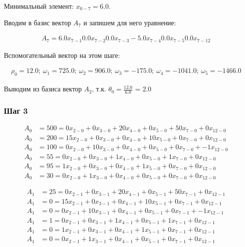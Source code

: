 Минимальный элемент: $x_{0-7} = 6.0$.

Вводим в базис вектор $A_{7}$ и запишем для него уравнение:

\small

\vspace{-\baselineskip}\begin{align*}
A_{7} = 6.0x_{7-1}0.0x_{7-2}0.0x_{7-3}-5.0x_{7-4}0.0x_{7-5}0.0x_{7-12}
\end{align*}

\normalsize

Вспомогательный вектор на этом шаге:

\vspace{-\baselineskip}\begin{align*}
\rho_{0} = 12.0;\ \omega_{1} = 725.0;\ \omega_{2} = 906.0;\ \omega_{3} = -175.0;\ \omega_{4} = -1041.0;\ \omega_{5} = -1466.0
\end{align*}

Выводим из базиса вектор $A_2$, т.к. $\theta_0 = \frac{12.0}{6.0}$ = 2.0

\subsubsection{Шаг 3}

\small

\vspace{-\baselineskip}\begin{align*}
	A_{0} &= 500 = 0x_{2-0} + 0x_{3-0} + 20x_{4-0} + 0x_{5-0} + 50x_{7-0} + 0x_{12-0} \\ 
	A_{0} &= 200 = 15x_{2-0} + 0x_{3-0} + 0x_{4-0} + 10x_{5-0} + 0x_{7-0} + 0x_{12-0} \\ 
	A_{0} &= 100 = 0x_{2-0} + 10x_{3-0} + 0x_{4-0} + 0x_{5-0} + 0x_{7-0} + -1x_{12-0} \\ 
	A_{0} &= 55 = 0x_{2-0} + 0x_{3-0} + 1x_{4-0} + 0x_{5-0} + 1x_{7-0} + 0x_{12-0} \\ 
	A_{0} &= 95 = 1x_{2-0} + 0x_{3-0} + 0x_{4-0} + 1x_{5-0} + 0x_{7-0} + 0x_{12-0} \\ 
	A_{0} &= 30 = 0x_{2-0} + 1x_{3-0} + 0x_{4-0} + 0x_{5-0} + 0x_{7-0} + 0x_{12-0}
\end{align*}

\vspace{-\baselineskip}\begin{align*}
	A_{1} &= 25 = 0x_{2-1} + 0x_{3-1} + 20x_{4-1} + 0x_{5-1} + 50x_{7-1} + 0x_{12-1} \\ 
	A_{1} &= 0 = 15x_{2-1} + 0x_{3-1} + 0x_{4-1} + 10x_{5-1} + 0x_{7-1} + 0x_{12-1} \\ 
	A_{1} &= 0 = 0x_{2-1} + 10x_{3-1} + 0x_{4-1} + 0x_{5-1} + 0x_{7-1} + -1x_{12-1} \\ 
	A_{1} &= 1 = 0x_{2-1} + 0x_{3-1} + 1x_{4-1} + 0x_{5-1} + 1x_{7-1} + 0x_{12-1} \\ 
	A_{1} &= 0 = 1x_{2-1} + 0x_{3-1} + 0x_{4-1} + 1x_{5-1} + 0x_{7-1} + 0x_{12-1} \\ 
	A_{1} &= 0 = 0x_{2-1} + 1x_{3-1} + 0x_{4-1} + 0x_{5-1} + 0x_{7-1} + 0x_{12-1}
\end{align*}

